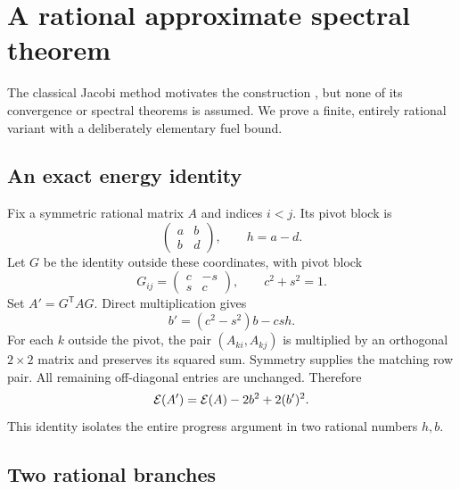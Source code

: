 \section{A rational approximate spectral theorem}
\label{sec:jacobi}

The classical Jacobi method motivates the construction \cite{jacobinotes}, but none of its convergence or spectral theorems is assumed. We prove a finite, entirely rational variant with a deliberately elementary fuel bound.

\subsection{An exact energy identity}

Fix a symmetric rational matrix $A$ and indices $i<j$. Its pivot block is
\[
 \begin{pmatrix}a&b\\b&d\end{pmatrix},\qquad h=a-d.
\]
Let $G$ be the identity outside these coordinates, with pivot block
\[
 G_{ij}=\begin{pmatrix}c&-s\\s&c\end{pmatrix},
 \qquad c^2+s^2=1.
\]
Set $A'=G^{\mathsf T}AG$. Direct multiplication gives
\begin{equation}
 b'=(c^2-s^2)b-csh. \label{eq:pivot}
\end{equation}
For each $k$ outside the pivot, the pair $(A_{ki},A_{kj})$ is multiplied by an orthogonal $2\times2$ matrix and preserves its squared sum. Symmetry supplies the matching row pair. All remaining off-diagonal entries are unchanged. Therefore
\begin{equation}
 \mathcal E(A')=\mathcal E(A)-2b^2+2(b')^2. \label{eq:energy}
\end{equation}
This identity isolates the entire progress argument in two rational numbers $h,b$.

\subsection{Two rational branches}

